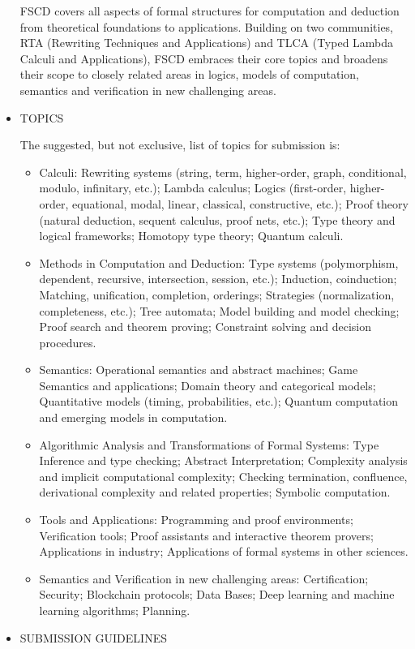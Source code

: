 \documentclass[prodmode,acmtecs]{acmsmall} %
\begin{document}
\begin{itemize}
  FSCD covers all aspects of formal structures for computation and deduction from theoretical foundations to applications. Building on two communities, RTA (Rewriting Techniques and Applications) and TLCA (Typed Lambda Calculi and Applications), FSCD embraces their core topics and broadens their scope to closely related areas in logics, models of computation, semantics and verification in new challenging areas. 
 
\item  TOPICS  
 
  The suggested, but not exclusive, list of topics for submission is: 
 
\begin{itemize}\item  Calculi: Rewriting systems (string, term, higher-order, graph, conditional, modulo, infinitary, etc.); Lambda calculus; Logics (first-order, higher-order, equational, modal, linear, classical, constructive, etc.); Proof theory (natural deduction, sequent calculus, proof nets, etc.); Type theory and logical frameworks; Homotopy type theory; Quantum calculi.
\item  Methods in Computation and Deduction: Type systems (polymorphism, dependent, recursive, intersection, session, etc.); Induction, coinduction; Matching, unification, completion, orderings; Strategies (normalization, completeness, etc.); Tree automata; Model building and model checking; Proof search and theorem proving; Constraint solving and decision procedures.
\item  Semantics: Operational semantics and abstract machines; Game Semantics and applications; Domain theory and categorical models; Quantitative models (timing, probabilities, etc.); Quantum computation and emerging models in computation.
\item  Algorithmic Analysis and Transformations of Formal Systems: Type Inference and type checking; Abstract Interpretation; Complexity analysis and implicit computational complexity; Checking termination, confluence, derivational complexity and related properties; Symbolic computation.
\item  Tools and Applications: Programming and proof environments; Verification tools; Proof assistants and interactive theorem provers; Applications in industry; Applications of formal systems in other sciences.
\item  Semantics and Verification in new challenging areas: Certification; Security; Blockchain protocols; Data Bases; Deep learning and machine learning algorithms; Planning.
\end{itemize} 
\item  SUBMISSION GUIDELINES 
 

\end{itemize}
\end{document}
